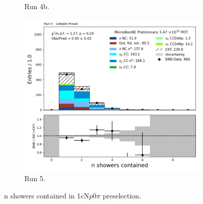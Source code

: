 \begin{figure}[H]
\begin{subfigure}[t]{0.32\linewidth}
        \caption{Run 4b.}
    \end{subfigure}%
    \hspace{0.2cm}%
    \begin{subfigure}[t]{0.32\linewidth}
        \includegraphics[width=\linewidth]{technote/Appendix_Preselection/Figures/1eNp0pi/Run5/n_showers_contained_Run5_1eNp0pi_Presel.png}
        \caption{Run 5.}
    \end{subfigure}
    \caption{n showers contained in 1$e$N$p$0$\pi$ preselection.}
\end{figure}

